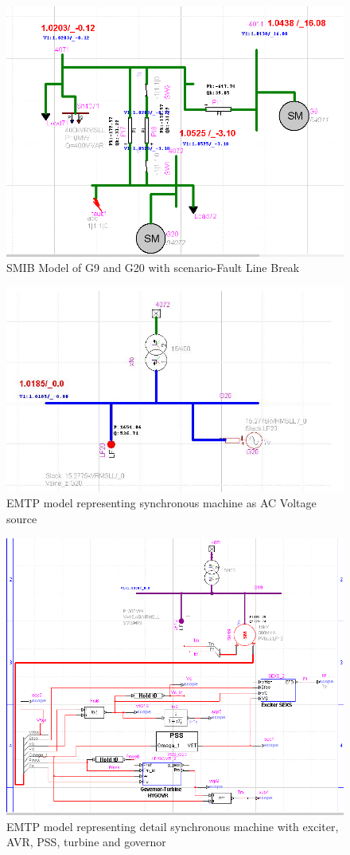 \documentclass{report}
\begin{document}
\begin{figure}
    \centering
    \includegraphics[width=0.8\linewidth]{Figure_Nordic/Results/G9G20/EMTPG9G20Model.png}
    \caption{SMIB Model of G9 and G20 with scenario-Fault Line Break}
    \label{fig:G9G20}
\end{figure}
\begin{figure}
    \centering
    \includegraphics[width=0.8\linewidth]{Figure_Nordic/SMasACVoltageSource.JPG}
    \caption{EMTP model representing synchronous machine as AC Voltage source}
    \label{fig:ACSM}
\end{figure}

\begin{figure}
    \centering
    \includegraphics[width=0.8\linewidth]{Figure_Nordic/SynchronousGeneratorEMTP.png}
    \caption{EMTP model representing detail synchronous machine with exciter, AVR, PSS, turbine and governor}
    \label{fig:SGDetail}
\end{figure}
\end{document}

